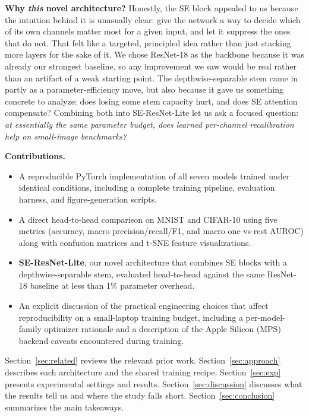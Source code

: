 \documentclass[conference,10pt]{IEEEtran}
\begin{document}
\noindent\textbf{Why \emph{this} novel architecture?} Honestly, the
SE block appealed to us because the intuition behind it is unusually
clear: give the network a way to decide which of its own channels
matter most for a given input, and let it suppress the ones that
do not. That felt like a targeted, principled idea rather than just
stacking more layers for the sake of it. We chose ResNet-18 as the
backbone because it was already our strongest baseline, so any
improvement we saw would be real rather than an artifact of a weak
starting point. The depthwise-separable stem came in partly as a
parameter-efficiency move, but also because it gave us something
concrete to analyze: does losing some stem capacity hurt, and does
SE attention compensate? Combining both into SE-ResNet-Lite let us
ask a focused question: \emph{at essentially the same parameter
budget, does learned per-channel recalibration help on small-image
benchmarks?}

\noindent\textbf{Contributions.}
\begin{itemize}
  \item A reproducible PyTorch implementation of all seven models
    trained under identical conditions, including a complete training
    pipeline, evaluation harness, and figure-generation scripts.
  \item A direct head-to-head comparison on MNIST and CIFAR-10 using
    five metrics (accuracy, macro precision/recall/F1, and macro
    one-vs-rest AUROC) along with confusion matrices and t-SNE feature
    visualizations.
  \item \textbf{SE-ResNet-Lite}, our novel architecture that combines
    SE blocks with a depthwise-separable stem, evaluated head-to-head
    against the same ResNet-18 baseline at less than 1\% parameter
    overhead.
  \item An explicit discussion of the practical engineering choices
    that affect reproducibility on a small-laptop training budget,
    including a per-model-family optimizer rationale and a description
    of the Apple Silicon (MPS) backend caveats encountered during
    training.
\end{itemize}

\noindent Section~\ref{sec:related} reviews the relevant prior work.
Section~\ref{sec:approach} describes each architecture and the shared
training recipe. Section~\ref{sec:exp} presents experimental settings
and results. Section~\ref{sec:discussion} discusses what the results
tell us and where the study falls short.
Section~\ref{sec:conclusion} summarizes the main takeaways.
\end{document}
